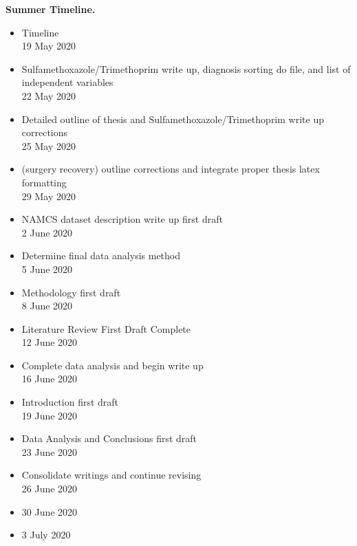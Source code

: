 \noindent \textbf{Summer Timeline.}
\begin{itemize}
    \item Timeline\\
    19 May 2020
    
    \item Sulfamethoxazole/Trimethoprim write up, diagnosis sorting do file, and list of independent variables\\
    22 May 2020
    
    \item Detailed outline of thesis and Sulfamethoxazole/Trimethoprim write up corrections\\
    25 May 2020

    \item (surgery recovery) outline corrections and integrate proper thesis latex formatting\\
    29 May 2020

    \item NAMCS dataset description write up first draft\\
    2 June 2020

    \item Determine final data analysis method\\
    5 June 2020

    \item Methodology first draft\\
    8 June 2020

    \item Literature Review First Draft Complete\\
    12 June 2020

    \item Complete data analysis and begin write up\\
    16 June 2020
    
    \item Introduction first draft\\
    19 June 2020

    \item Data Analysis and Conclusions first draft\\
    23 June 2020

    \item Consolidate writings and continue revising\\
    26 June 2020

    \item 30 June 2020

    \item 3 July 2020


\end{itemize}
